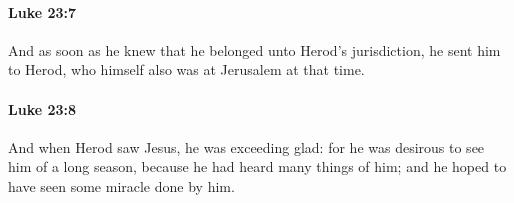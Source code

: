 		\paragraph{Luke 23:7} %
			\label{LUKE-23-7}

			And as soon as he knew that he belonged unto Herod's jurisdiction, he sent him to Herod, who himself also was at Jerusalem at that time.

			\begin{framed}
			\scriptsize
				\begin{compactdesc}
					\item[SBLG] 
				\end{compactdesc}
			\end{framed}

		\paragraph{Luke 23:8} %
			\label{LUKE-23-8}

			And when Herod saw Jesus, he was exceeding glad: for he was desirous to see him of a long season, because he had heard many things of him; and he hoped to have seen some miracle done by him.

